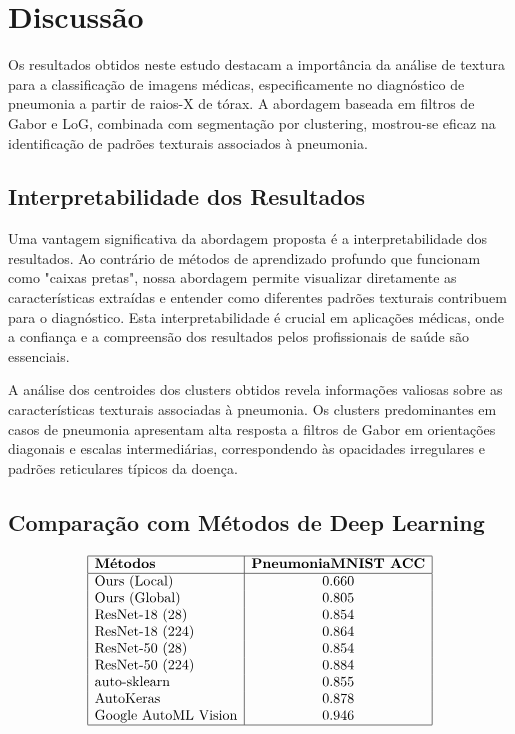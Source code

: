 \documentclass[sigconf,nonacm]{acmart}
\begin{document}
\section{Discussão}

Os resultados obtidos neste estudo destacam a importância da análise de textura para a classificação de imagens médicas, especificamente no diagnóstico de pneumonia a partir de raios-X de tórax. A abordagem baseada em filtros de Gabor e LoG, combinada com segmentação por clustering, mostrou-se eficaz na identificação de padrões texturais associados à pneumonia.

\subsection{Interpretabilidade dos Resultados}

Uma vantagem significativa da abordagem proposta é a interpretabilidade dos resultados. Ao contrário de métodos de aprendizado profundo que funcionam como "caixas pretas", nossa abordagem permite visualizar diretamente as características extraídas e entender como diferentes padrões texturais contribuem para o diagnóstico. Esta interpretabilidade é crucial em aplicações médicas, onde a confiança e a compreensão dos resultados pelos profissionais de saúde são essenciais.

A análise dos centroides dos clusters obtidos revela informações valiosas sobre as características texturais associadas à pneumonia. Os clusters predominantes em casos de pneumonia apresentam alta resposta a filtros de Gabor em orientações diagonais e escalas intermediárias, correspondendo às opacidades irregulares e padrões reticulares típicos da doença.

\subsection{Comparação com Métodos de Deep Learning}

\[
\begin{array}{|l|c|}
\hline
\textbf{Métodos} & \textbf{PneumoniaMNIST ACC} \\
\hline
\text{Ours (Local)} & 0.660 \\
\text{Ours (Global)} & 0.805 \\
\text{ResNet-18 (28)} & 0.854 \\
\text{ResNet-18 (224)} & 0.864 \\
\text{ResNet-50 (28)} & 0.854 \\
\text{ResNet-50 (224)} & 0.884 \\
\text{auto-sklearn} & 0.855 \\
\text{AutoKeras} & 0.878 \\
\text{Google AutoML Vision} & 0.946 \\
\hline
\end{array}
\]
\end{document}
